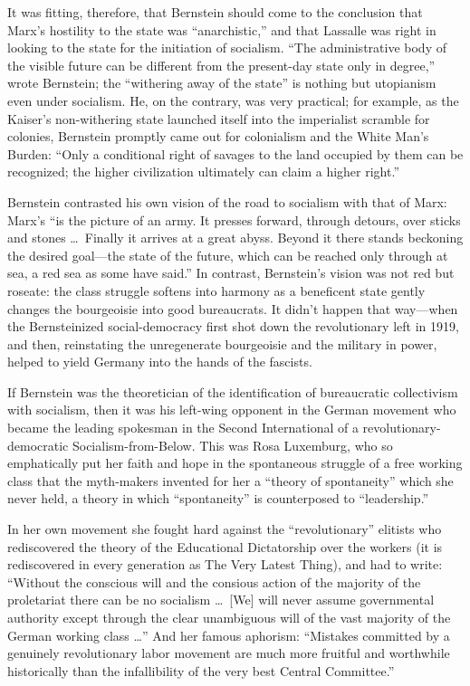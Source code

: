 It was fitting, therefore, that Bernstein should come to the conclusion that Marx's hostility to the state was ``anarchistic,'' and that Lassalle was right in looking to the state for the initiation of socialism. ``The administrative body of the visible future can be different from the present-day state only in degree,'' wrote Bernstein; the ``withering away of the state'' is nothing but utopianism even under socialism. He, on the contrary, was very practical; for example, as the Kaiser's non-withering state launched itself into the imperialist scramble for colonies, Bernstein promptly came out for colonialism and the White Man's Burden: ``Only a conditional right of savages to the land occupied by them can be recognized; the higher civilization ultimately can claim a higher right.''

Bernstein contrasted his own vision of the road to socialism with that of Marx: Marx's ``is the picture of an army. It presses forward, through detours, over sticks and stones \ldots\ Finally it arrives at a great abyss. Beyond it there stands beckoning the desired goal---the state of the future, which can be reached only through at sea, a red sea as some have said.'' In contrast, Bernstein's vision was not red but roseate: the class struggle softens into harmony as a beneficent state gently changes the bourgeoisie into good bureaucrats. It didn't happen that way---when the Bernsteinized social-democracy first shot down the revolutionary left in 1919, and then, reinstating the unregenerate bourgeoisie and the military in power, helped to yield Germany into the hands of the fascists.

If Bernstein was the theoretician of the identification of bureaucratic collectivism with socialism, then it was his left-wing opponent in the German movement who became the leading spokesman in the Second International of a revolutionary-democratic Socialism-from-Below. This was Rosa Luxemburg, who so emphatically put her faith and hope in the spontaneous struggle of a free working class that the myth-makers invented for her a ``theory of spontaneity'' which she never held, a theory in which ``spontaneity'' is counterposed to ``leadership.''

In her own movement she fought hard against the ``revolutionary'' elitists who rediscovered the theory of the Educational Dictatorship over the workers (it is rediscovered in every generation as The Very Latest Thing), and had to write: ``Without the conscious will and the consious action of the majority of the proletariat there can be no socialism \ldots\ [We] will never assume governmental authority except through the clear unambiguous will of the vast majority of the German working class \ldots'' And her famous aphorism: ``Mistakes committed by a genuinely revolutionary labor movement are much more fruitful and worthwhile historically than the infallibility of the very best Central Committee.''

